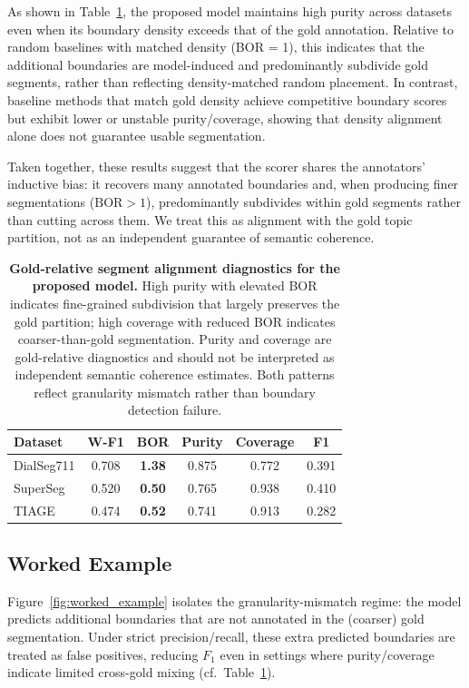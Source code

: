 \documentclass{article}
\begin{document}
As shown in Table~\ref{tab:purity_coverage}, the proposed model maintains
high purity across datasets even when its boundary density exceeds that
of the gold annotation. Relative to random baselines with matched
density (BOR = 1), this indicates that the additional boundaries are
model-induced and predominantly subdivide gold segments, rather than
reflecting density-matched random placement. In contrast, baseline
methods that match gold density achieve competitive boundary scores but
exhibit lower or unstable purity/coverage, showing that density
alignment alone does not guarantee usable segmentation.

Taken together, these results suggest that the scorer shares the
annotators' inductive bias: it recovers many annotated boundaries and,
when producing finer segmentations ($\mathrm{BOR}>1$), predominantly
subdivides within gold segments rather than cutting across them. We
treat this as alignment with the gold topic partition, not as an
independent guarantee of semantic coherence.

\begin{table}[t]
  \centering
  \begin{tabular}{l c c c c c}
    \toprule
    Dataset & W-F1 & \textbf{BOR} & Purity & Coverage & F1 \\
    \midrule
    DialSeg711 & 0.708 & \textbf{1.38} & 0.875 & 0.772 & 0.391 \\
    SuperSeg   & 0.520 & \textbf{0.50} & 0.765 & 0.938 & 0.410 \\
    TIAGE      & 0.474 & \textbf{0.52} & 0.741 & 0.913 & 0.282 \\
    \bottomrule
  \end{tabular}
  \caption{\textbf{Gold-relative segment alignment diagnostics for the proposed model.}
    High purity with elevated BOR indicates fine-grained subdivision that
    largely preserves the gold partition; high coverage with reduced BOR
    indicates coarser-than-gold segmentation. Purity and coverage are
    gold-relative diagnostics and should not be interpreted as independent
    semantic coherence estimates. Both patterns reflect granularity
    mismatch rather than boundary detection failure.}
  \label{tab:purity_coverage}
\end{table}

\subsection{Worked Example}
\label{sec:worked_example}
Figure~\ref{fig:worked_example} isolates the granularity-mismatch
regime: the model predicts additional boundaries that are not annotated
in the (coarser) gold segmentation. Under strict precision/recall,
these extra predicted boundaries are treated as false positives,
reducing $F_1$ even in settings where purity/coverage indicate limited
cross-gold mixing (cf.\ Table~\ref{tab:purity_coverage}).
\end{document}
